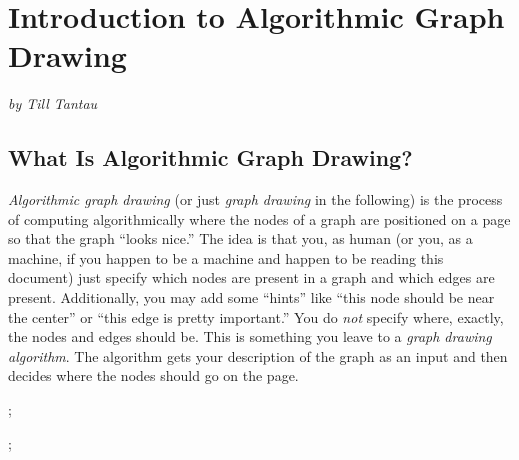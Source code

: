%
%
%



\section{Introduction to Algorithmic Graph Drawing}

{\noindent\emph{by Till Tantau}}

\subsection{What Is Algorithmic Graph Drawing?}

\emph{Algorithmic graph drawing} (or just \emph{graph drawing} in the
following) is the process of computing algorithmically where the nodes of
a graph are positioned on a page so that the graph ``looks nice.'' The
idea is that you, as human (or you, as a machine, if you happen to be
a machine and happen to be reading this document) just specify which
nodes are present in a graph and which edges are
present. Additionally, you may add some ``hints'' like ``this node
should be near the center'' or ``this edge is pretty important.'' You
do \emph{not} specify where, exactly, the nodes and edges should
be. This is something you leave to a \emph{graph drawing
  algorithm}. The algorithm gets your description of the graph as an
input and then decides where the nodes should go on the page.

\begin{codeexample}[]
\tikz {};
\end{codeexample}

\begin{codeexample}[]
\tikz {};  
\end{codeexample}

